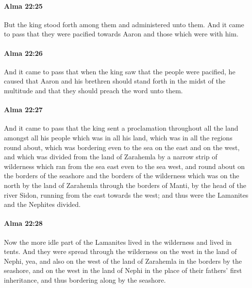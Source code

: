 		\paragraph{Alma 22:25} %
			\label{ALMA-22-25}

			But the king stood forth among them and administered unto them.
			And it came to pass that they were pacified towards Aaron
			and those which were with him.

		\paragraph{Alma 22:26} %
			\label{ALMA-22-26}

			And it came to pass that when the king saw that the people were pacified,
			he caused that Aaron and his brethren should stand forth
			in the midst of the multitude
			and that they should preach the word unto them.

		\paragraph{Alma 22:27} %
			\label{ALMA-22-27}

			And it came to pass that the king sent a proclamation throughout all the land
			amongst all his people which was in all his land,
			which was in all the regions round about,
			which was bordering even to the sea on the east and on the west,
			and which was divided from the land of Zarahemla
			by a narrow strip of wilderness which ran from the sea east even to the sea west,
			and round about on the borders of the seashore and the borders of the wilderness
			which was on the north by the land of Zarahemla through the borders of Manti,
			by the head of the river Sidon, running from the east towards the west;
			and thus were the Lamanites and the Nephites divided.

		\paragraph{Alma 22:28} %
			\label{ALMA-22-28}

			Now the more idle part of the Lamanites lived in the wilderness and lived in tents.
			And they were spread through the wilderness on the west in the land of Nephi,
			yea, and also on the west of the land of Zarahemla in the borders by the seashore,
			and on the west in the land of Nephi in the place of their fathers' first inheritance,
			and thus bordering along by the seashore.

